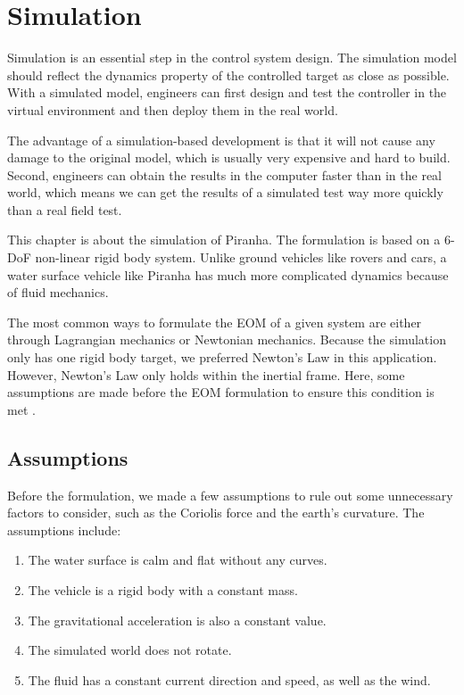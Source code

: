 \chapter{Simulation}

Simulation is an essential step in the control system design. The simulation model should reflect the dynamics property of the controlled target as close as possible. With a simulated model, engineers can first design and test the controller in the virtual environment and then deploy them in the real world. 

The advantage of a simulation-based development is that it will not cause any damage to the original model, which is usually very expensive and hard to build. Second, engineers can obtain the results in the computer faster than in the real world, which means we can get the results of a simulated test way more quickly than a real field test.

This chapter is about the simulation of Piranha. The formulation is based on a 6-DoF non-linear rigid body system. Unlike ground vehicles like rovers and cars, a water surface vehicle like Piranha has much more complicated dynamics because of fluid mechanics.

The most common ways to formulate the EOM of a given system are either through Lagrangian mechanics or Newtonian mechanics. Because the simulation only has one rigid body target, we preferred Newton's Law in this application. However, Newton's Law only holds within the inertial frame. Here, some assumptions are made before the EOM formulation to ensure this condition is met \cite{nahon1996simplified}.

\section{Assumptions}

Before the formulation, we made a few assumptions to rule out some unnecessary factors to consider, such as the Coriolis force and the earth's curvature. The assumptions include:

\begin{enumerate}
    \item The water surface is calm and flat without any curves.
    \item The vehicle is a rigid body with a constant mass. 
    \item The gravitational acceleration is also a constant value.
    \item The simulated world does not rotate.
    \item The fluid has a constant current direction and speed, as well as the wind.
\end{enumerate}

